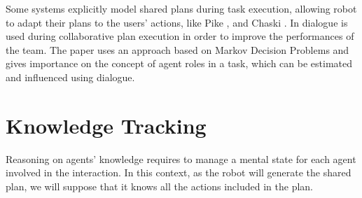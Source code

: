 \documentclass{llncs}
\begin{document}


Some systems explicitly model shared plans during task execution, allowing robot to adapt their plans to the users' actions, like Pike
\cite{levine2014concurrent,karpas2015robust}, and Chaski \cite{shah2011improved}.
In \cite{clairrobot} dialogue is used during collaborative plan execution in order to improve the performances of the team. The paper uses an approach based on Markov Decision Problems and gives importance on the concept of agent roles in a task, which can be estimated and influenced using dialogue. 













\section{Knowledge Tracking}
Reasoning on agents' knowledge requires to manage a mental state for each agent involved in the interaction.
In this context, as the robot will generate the shared plan, we will suppose that it knows all the actions included in the plan.
\end{document}
